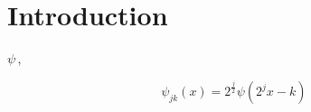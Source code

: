 \chapter{Introduction}
\label{chap:introduction}

\(\scriptstyle \psi\,\),

\[\psi_{jk}(x) = 2^\frac{j}{2} \psi\left(2^jx - k\right)\,\]

